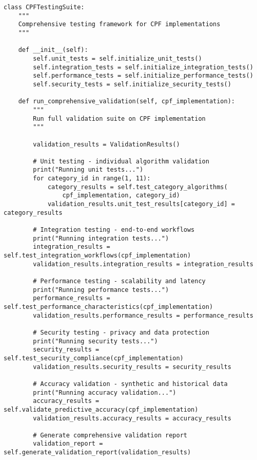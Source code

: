 \documentclass[10pt,twocolumn]{IEEEtran}
\begin{document}
\begin{lstlisting}[caption={CPF Testing and Validation Framework}]
class CPFTestingSuite:
    """
    Comprehensive testing framework for CPF implementations
    """
    
    def __init__(self):
        self.unit_tests = self.initialize_unit_tests()
        self.integration_tests = self.initialize_integration_tests()
        self.performance_tests = self.initialize_performance_tests()
        self.security_tests = self.initialize_security_tests()
        
    def run_comprehensive_validation(self, cpf_implementation):
        """
        Run full validation suite on CPF implementation
        """
        
        validation_results = ValidationResults()
        
        # Unit testing - individual algorithm validation
        print("Running unit tests...")
        for category_id in range(1, 11):
            category_results = self.test_category_algorithms(
                cpf_implementation, category_id)
            validation_results.unit_test_results[category_id] = category_results
        
        # Integration testing - end-to-end workflows
        print("Running integration tests...")
        integration_results = self.test_integration_workflows(cpf_implementation)
        validation_results.integration_results = integration_results
        
        # Performance testing - scalability and latency
        print("Running performance tests...")
        performance_results = self.test_performance_characteristics(cpf_implementation)
        validation_results.performance_results = performance_results
        
        # Security testing - privacy and data protection
        print("Running security tests...")
        security_results = self.test_security_compliance(cpf_implementation)
        validation_results.security_results = security_results
        
        # Accuracy validation - synthetic and historical data
        print("Running accuracy validation...")
        accuracy_results = self.validate_predictive_accuracy(cpf_implementation)
        validation_results.accuracy_results = accuracy_results
        
        # Generate comprehensive validation report
        validation_report = self.generate_validation_report(validation_results)
        

\end{lstlisting}
\end{document}
